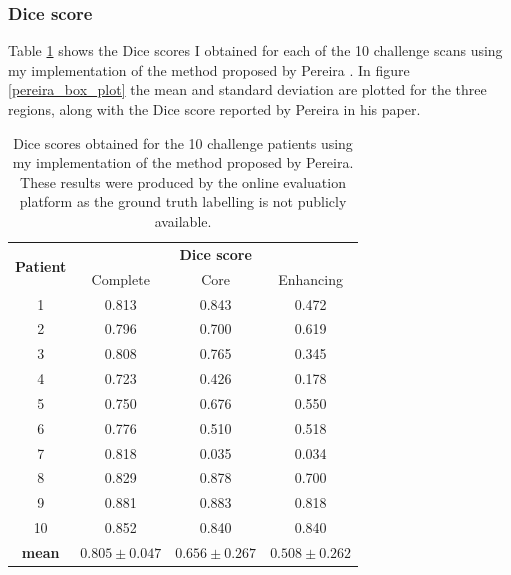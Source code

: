 \documentclass[12pt,a4paper,twoside,openright]{report}
\begin{document}
\subsubsection{Dice score}
Table \ref{table:pereira_dice_results} shows the Dice scores I obtained for each of the 10 challenge scans using my implementation of the method proposed by Pereira \cite{pereira}. In figure \ref{pereira_box_plot} the mean and standard deviation are plotted for the three regions, along with the Dice score reported by Pereira in his paper. 
\begin{table}
\centering	
\begin{tabular}{ c | c c c} 
\multirow{2}{*}{\textbf{Patient}} & \multicolumn{3}{c}{\textbf{Dice score}} \\
 & Complete & Core & Enhancing \\
 \hline
1 & 0.813 & 0.843 & 0.472 \\
2 & 0.796 & 0.700 & 0.619 \\
3 & 0.808 & 0.765 & 0.345 \\
4 & 0.723 & 0.426 & 0.178 \\
5 & 0.750 & 0.676 & 0.550 \\
6 & 0.776 & 0.510 & 0.518 \\
7 & 0.818 & 0.035 & 0.034 \\
8 & 0.829 & 0.878 & 0.700 \\
9 & 0.881 & 0.883 & 0.818 \\
10 & 0.852 & 0.840 & 0.840 \\
\hline
\rule{0pt}{3ex}    
\textbf{mean} & $0.805 \pm 0.047$ & $0.656 \pm 0.267$ & $0.508 \pm 0.262$
\end{tabular}
\caption[Dice scores obtained for the 10 challenge patients using my implementation of the method proposed by Pereira.]{Dice scores obtained for the 10 challenge patients using my implementation of the method proposed by Pereira. These results were produced by the online evaluation platform as the ground truth labelling is not publicly available.}
\label{table:pereira_dice_results}
\end{table}
\end{document}
